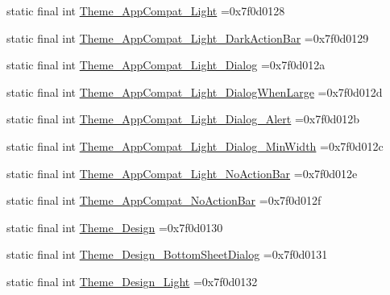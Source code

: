 \begin{DoxyCompactItemize}
\item 
static final int \mbox{\hyperlink{classbr_1_1unb_1_1cic_1_1mp_1_1marketmaster_1_1R_1_1style_a5d15c6567bf5f5987bdbdaa921c7f59a}{Theme\+\_\+\+App\+Compat\+\_\+\+Light}} =0x7f0d0128
\item 
static final int \mbox{\hyperlink{classbr_1_1unb_1_1cic_1_1mp_1_1marketmaster_1_1R_1_1style_a9172b0a38585fb2672ecef0981fd19d8}{Theme\+\_\+\+App\+Compat\+\_\+\+Light\+\_\+\+Dark\+Action\+Bar}} =0x7f0d0129
\item 
static final int \mbox{\hyperlink{classbr_1_1unb_1_1cic_1_1mp_1_1marketmaster_1_1R_1_1style_adffe289c267fb98067c2d58add9d031c}{Theme\+\_\+\+App\+Compat\+\_\+\+Light\+\_\+\+Dialog}} =0x7f0d012a
\item 
static final int \mbox{\hyperlink{classbr_1_1unb_1_1cic_1_1mp_1_1marketmaster_1_1R_1_1style_a440a74c346d7f8d98501502fa62c28d5}{Theme\+\_\+\+App\+Compat\+\_\+\+Light\+\_\+\+Dialog\+When\+Large}} =0x7f0d012d
\item 
static final int \mbox{\hyperlink{classbr_1_1unb_1_1cic_1_1mp_1_1marketmaster_1_1R_1_1style_a2d4b205085279d120db9921a5ec5fc6f}{Theme\+\_\+\+App\+Compat\+\_\+\+Light\+\_\+\+Dialog\+\_\+\+Alert}} =0x7f0d012b
\item 
static final int \mbox{\hyperlink{classbr_1_1unb_1_1cic_1_1mp_1_1marketmaster_1_1R_1_1style_ad8efa95219764ba458cb06f9bbc8c41d}{Theme\+\_\+\+App\+Compat\+\_\+\+Light\+\_\+\+Dialog\+\_\+\+Min\+Width}} =0x7f0d012c
\item 
static final int \mbox{\hyperlink{classbr_1_1unb_1_1cic_1_1mp_1_1marketmaster_1_1R_1_1style_ad8aa3555407b617ca4e20aa128b2f156}{Theme\+\_\+\+App\+Compat\+\_\+\+Light\+\_\+\+No\+Action\+Bar}} =0x7f0d012e
\item 
static final int \mbox{\hyperlink{classbr_1_1unb_1_1cic_1_1mp_1_1marketmaster_1_1R_1_1style_a6c30b9a68dd190e882f47c6f653d5b78}{Theme\+\_\+\+App\+Compat\+\_\+\+No\+Action\+Bar}} =0x7f0d012f
\item 
static final int \mbox{\hyperlink{classbr_1_1unb_1_1cic_1_1mp_1_1marketmaster_1_1R_1_1style_ae8836bd6d4cbe7437637aee35a48a9a4}{Theme\+\_\+\+Design}} =0x7f0d0130
\item 
static final int \mbox{\hyperlink{classbr_1_1unb_1_1cic_1_1mp_1_1marketmaster_1_1R_1_1style_a2373c7223ed859a92874a434b9d09e23}{Theme\+\_\+\+Design\+\_\+\+Bottom\+Sheet\+Dialog}} =0x7f0d0131
\item 
static final int \mbox{\hyperlink{classbr_1_1unb_1_1cic_1_1mp_1_1marketmaster_1_1R_1_1style_ae537128d8ba6f4b03d46f631dd892533}{Theme\+\_\+\+Design\+\_\+\+Light}} =0x7f0d0132

\end{DoxyCompactItemize}
